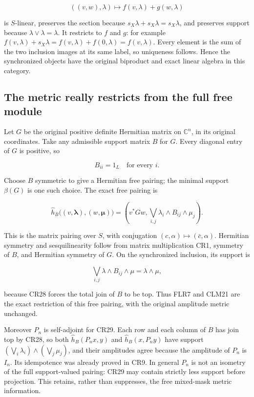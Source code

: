 \documentclass[11pt]{article}
\begin{document}
\[
((v,w),\lambda)\longmapsto f(v,\lambda)+g(w,\lambda)
\tag{CR27}
\]

is \(S\)-linear, preserves the section because \(s_X\lambda+s_X\lambda=s_X\lambda\), and preserves support because \(\lambda\vee\lambda=\lambda\). It restricts to \(f\) and \(g\): for example \(f(v,\lambda)+s_X\lambda=f(v,\lambda)+f(0,\lambda)=f(v,\lambda)\). Every element is the sum of the two inclusion images at its same label, so uniqueness follows. Hence the synchronized objects have the original biproduct and exact linear algebra in this category.

\subsection{The metric really restricts from the full free module}

Let \(G\) be the original positive definite Hermitian matrix on \(\mathbb C^n\), in its original coordinates. Take any admissible support matrix \(B\) for \(G\). Every diagonal entry of \(G\) is positive, so

\[
B_{ii}=1_L\quad\text{for every }i.
\tag{CR28}
\]

Choose \(B\) symmetric to give a Hermitian free pairing; the minimal support \(\beta(G)\) is one such choice. The exact free pairing is

\[
\widehat h_B\bigl((v,\boldsymbol\lambda),(w,\boldsymbol\mu)\bigr)
 =\left(v^*Gw,
 \bigvee_{i,j}\lambda_i\wedge B_{ij}\wedge\mu_j\right).
\tag{CR29}
\]

This is the matrix pairing over \(S\), with conjugation \((c,\alpha)\mapsto(\bar c,\alpha)\). Hermitian symmetry and sesquilinearity follow from matrix multiplication CR1, symmetry of \(B\), and Hermitian symmetry of \(G\). On the synchronized inclusion, its support is

\[
\bigvee_{i,j}\lambda\wedge B_{ij}\wedge\mu
 =\lambda\wedge\mu,
\tag{CR30}
\]

because CR28 forces the total join of \(B\) to be top. Thus FLR7 and CLM21 are the exact restriction of this free pairing, with the original amplitude metric unchanged.

Moreover \(P_n\) is self-adjoint for CR29. Each row and each column of \(B\) has join top by CR28, so both \(\widehat h_B(P_nx,y)\) and \(\widehat h_B(x,P_ny)\) have support
\((\bigvee_i\lambda_i)\wedge(\bigvee_j\mu_j)\), and their amplitudes agree because the amplitude of \(P_n\) is \(I_n\). Its idempotence was already proved in CR9. In general \(P_n\) is not an isometry of the full support-valued pairing: CR29 may contain strictly less support before projection. This retains, rather than suppresses, the free mixed-mask metric information.
\end{document}
